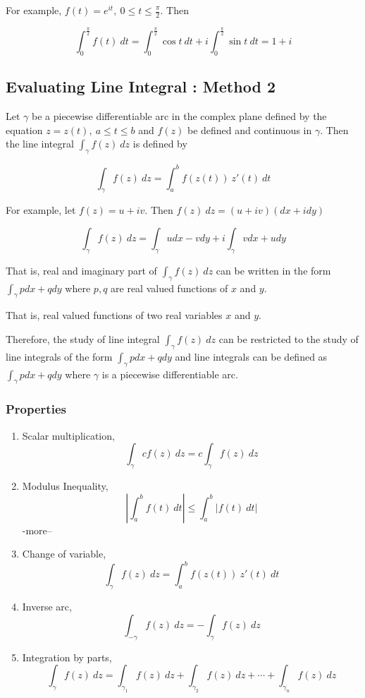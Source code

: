 	For example, $f(t) = e^{it},\ 0 \le t \le \frac{\pi}{2}$. Then 

\[ \int_0^{\frac{\pi}{2}} f(t)\ dt = \int_0^{\frac{\pi}{2}} \cos t\ dt + i \int_0^{\frac{\pi}{2}} \sin t\ dt = 1 + i \]

\subsection{Evaluating Line Integral : Method 2}
	Let $\gamma$ be a piecewise differentiable arc in the complex plane defined by the equation $z = z(t),\ a \le t \le b$ and $f(z)$ be defined and continuous in $\gamma$. Then the line integral $\int_\gamma f(z)\ dz$ is defined by

\[ \int_\gamma f(z)\ dz = \int_a^b f(z(t))\ z'(t)\ dt \]

	For example, let $f(z) = u+iv$. Then $f(z)\ dz = (u+iv)(dx+idy)$

\[ \int_\gamma f(z)\ dz = \int_\gamma udx - vdy + i \int_\gamma vdx + udy \]

	That is, real and imaginary part of $\int_\gamma f(z)\ dz$ can be written in the form $\int_\gamma pdx + qdy$ where $p,q$ are real valued functions of $x$ and $y$.
\begin{commentary}
	That is, real valued functions of two real variables $x$ and $y$.
\end{commentary}
	Therefore, the study of line integral $\int_\gamma f(z)\ dz$ can be restricted to the study of line integrals of the form $\int_\gamma pdx+qdy$ and line integrals can be defined as $\int_\gamma pdx+qdy$ where $\gamma$ is a piecewise differentiable arc.
\subsubsection{Properties}
\begin{enumerate}
	\item Scalar multiplication,
		\[ \int_\gamma cf(z)\ dz = c\int_\gamma f(z)\ dz \]
	\item Modulus Inequality,
		\[ \left| \int_a^b f(t)\ dt \right| \le \int_a^b |f(t)\ dt| \] -more--
	\item Change of variable,
		\[ \int_\gamma f(z)\ dz = \int_a^b f(z(t))\ z'(t)\ dt \]
	\item Inverse arc,
		\[ \int_{-\gamma} f(z)\ dz = -\int_\gamma f(z)\ dz \]
	\item Integration by parts,
		\[ \int_\gamma f(z)\ dz = \int_{\gamma_1} f(z)\ dz + \int_{\gamma_2} f(z)\ dz+ \cdots + \int_{\gamma_n} f(z)\ dz \]
\end{enumerate}

